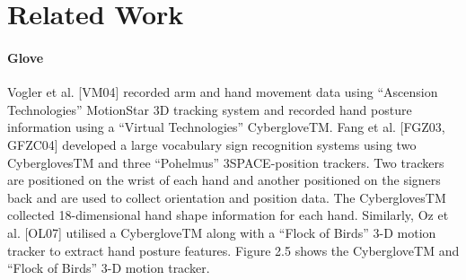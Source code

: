 \section{Related Work}

\paragraph*{Glove} Vogler et al. [VM04] recorded arm and hand movement data using “Ascension Technologies” MotionStar 3D tracking system and recorded hand posture information using a “Virtual Technologies” CybergloveTM. Fang et al. [FGZ03, GFZC04] developed a large vocabulary sign recognition systems using two CyberglovesTM and three “Pohelmus” 3SPACE-position trackers. Two trackers are positioned on the wrist of each hand and another positioned on the signers back and are used to collect orientation and position data. The CyberglovesTM collected 18-dimensional hand shape information for each hand. Similarly, Oz et al. [OL07] utilised a CybergloveTM along with a “Flock of Birds” 3-D motion tracker to extract hand posture features. Figure 2.5 shows the CybergloveTM and “Flock of Birds” 3-D motion tracker.